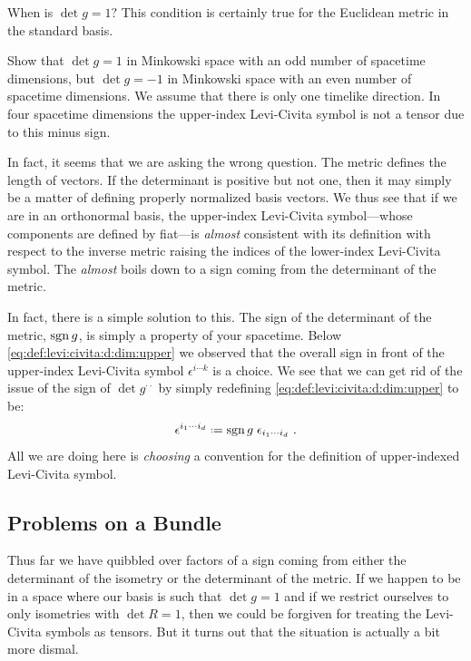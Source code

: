 \documentclass[12pt, oneside]{report}    %
\begin{document}
\begin{subappendices}
When is $\det g = 1?$ This condition is certainly true for the Euclidean metric in the standard basis. 
\begin{exercise}
Show that $\det g =1$ in Minkowski space with an odd number of spacetime dimensions, but $\det g = -1$ in Minkowski space with an even number of spacetime dimensions. We assume that there is only one timelike direction. In four spacetime dimensions the upper-index Levi-Civita symbol is not a tensor due to this minus sign.
\end{exercise}
In fact, it seems that we are asking the wrong question. The metric defines the length of vectors. If the determinant is positive but not one, then it may simply be a matter of defining properly normalized basis vectors. We thus see that if we are in an orthonormal basis, the upper-index Levi-Civita symbol---whose components are defined by fiat---is \emph{almost} consistent with its definition with respect to the inverse metric raising the indices of the lower-index Levi-Civita symbol. The \emph{almost} boils down to a sign coming from the determinant of the metric.

In fact, there is a simple solution to this. The sign of the determinant of the metric, $\operatorname{\textnormal{sgn}} g$, is simply a property of your spacetime. Below \eqref{eq:def:levi:civita:d:dim:upper} we observed that the overall sign in front of the upper-index Levi-Civita symbol $\epsilon^{i\cdots k}$ is a choice. We see that we can get rid of the issue of the sign of $\det g^{\cdot\cdot}$ by simply redefining \eqref{eq:def:levi:civita:d:dim:upper} to be:
\begin{align}
    \epsilon^{i_1\cdots i_d}
    \defeq
    \sgn g\; 
    \epsilon_{i_1\cdots i_d} \ .
    \label{eq:def:levi:civita:d:dim:upper:with:sign}
\end{align}
All we are doing here is \emph{choosing} a convention for the definition of upper-indexed Levi-Civita symbol.

\subsection{Problems on a Bundle} 

Thus far we have quibbled over factors of a sign coming from either the determinant of the isometry or the determinant of the metric. If we happen to be in a space where our basis is such that $\det g = 1$ and if we restrict ourselves to only isometries with $\det R = 1$, then we could be forgiven for treating the Levi-Civita symbols as tensors. But it turns out that the situation is actually a bit more dismal.


\end{subappendices}
\end{document}
